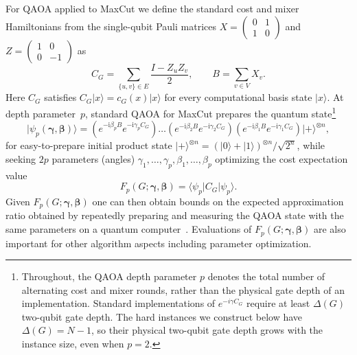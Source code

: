 \documentclass[11pt]{article}
\newcommand{\ii}{\mathrm{i}}
\newcommand{\sh}[1]{{#1}}
\begin{document}
For QAOA applied to MaxCut we define the standard cost and mixer Hamiltonians from the \sh{single-qubit} Pauli matrices $X=(\begin{smallmatrix} 0 & 1 \\ 1 & 0 \end{smallmatrix} )$ and
 $Z=(\begin{smallmatrix} 1 & 0 \\ 0 & -1 \end{smallmatrix} )$
as 
\begin{equation}
 C_G=\sum_{\{u,v\}\in E}\frac{I-Z_uZ_v}{2},
 \qquad
 B=\sum_{v\in V}X_v.
 \label{eq:hamiltonians}
\end{equation}
\sh{Here $C_G$ satisfies $C_G\lvert x\rangle=c_G(x)\lvert x\rangle$ for every computational basis state $\lvert x\rangle$. } %
At depth %
parameter~$p$, standard QAOA for MaxCut prepares the quantum state\footnote{\sh{Throughout, the QAOA depth parameter $p$ denotes the total number of
alternating cost and mixer rounds, rather than the physical gate
depth of an implementation.  Standard implementations of
$e^{-i\gamma C_G}$ %
require at least $\Delta(G)$ two-qubit %
gate depth. The hard instances we construct below 
have $\Delta(G)=N-1$, so their physical
two-qubit gate depth grows with the instance size,  even when
$p=2$.}} 
\begin{equation}
\lvert\psi_p(\boldsymbol\gamma,\boldsymbol\beta)\rangle
  =(e^{-\ii\beta_p B}e^{-\ii\gamma_p C_G})\dots (e^{-\ii\beta_2 B}e^{-\ii\gamma_2 C_G})( e^{-\ii\beta_1 B}e^{-\ii\gamma_1 C_G})
 \lvert+\rangle^{\otimes n},
 \label{eq:qaoa-state}
\end{equation}
\sh{for easy-to-prepare initial product state $\lvert+\rangle^{\otimes n}=(\lvert0\rangle+\lvert1\rangle)^{\otimes n}/\sqrt{2^n}$, }
while seeking $2p$ parameters (angles) 
$\gamma_1,\dots,\gamma_p,\beta_1,\dots,\beta_p$ optimizing the cost expectation value 
\begin{equation}
 F_p(G;\boldsymbol\gamma,\boldsymbol\beta)
 =\langle\psi_p\rvert C_G\lvert\psi_p\rangle.
 \label{eq:qaoa-objective}
\end{equation}
Given $F_p(G;\boldsymbol\gamma,\boldsymbol\beta)$ one can then obtain bounds on the expected approximation ratio obtained by %
repeatedly preparing and measuring the QAOA state 
with the same parameters on a quantum computer~\cite{Farhi2014,Wang2018,hadfield2018quantum}. \sh{Evaluations of $F_p(G;\boldsymbol\gamma,\boldsymbol\beta)$ 
are also important for other algorithm aspects including 
parameter optimization.}
\end{document}
